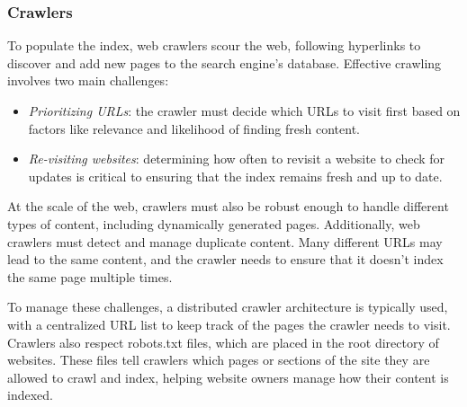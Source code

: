 \subsubsection{Crawlers}
To populate the index, web crawlers scour the web, following hyperlinks to discover and add new pages to the search engine's database. 
Effective crawling involves two main challenges:
\begin{itemize}
    \item \textit{Prioritizing URLs}: the crawler must decide which URLs to visit first based on factors like relevance and likelihood of finding fresh content.
    \item \textit{Re-visiting websites}: determining how often to revisit a website to check for updates is critical to ensuring that the index remains fresh and up to date.
\end{itemize}
\noindent At the scale of the web, crawlers must also be robust enough to handle different types of content, including dynamically generated pages.
Additionally, web crawlers must detect and manage duplicate content. Many different URLs may lead to the same content, and the crawler needs to ensure that it doesn't index the same page multiple times.

To manage these challenges, a distributed crawler architecture is typically used, with a centralized URL list to keep track of the pages the crawler needs to visit. 
Crawlers also respect robots.txt files, which are placed in the root directory of websites. 
These files tell crawlers which pages or sections of the site they are allowed to crawl and index, helping website owners manage how their content is indexed.
